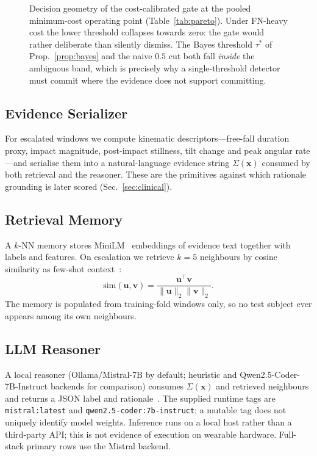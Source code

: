 \documentclass[journal]{IEEEtran}
\begin{document}
\begin{figure}[!t]
\centering
\resizebox{\linewidth}{!}{}
\caption{Decision geometry of the cost-calibrated gate at the pooled minimum-cost operating point (Table~\ref{tab:pareto}). Under FN-heavy cost the lower threshold collapses towards zero: the gate would rather deliberate than silently dismiss. The Bayes threshold $\tau^\ast$ of Prop.~\ref{prop:bayes} and the naive $0.5$ cut both fall \emph{inside} the ambiguous band, which is precisely why a single-threshold detector must commit where the evidence does not support committing.}
\label{fig:gateband}
\end{figure}



\subsection{Evidence Serializer}
For escalated windows we compute kinematic descriptors---free-fall duration proxy, impact magnitude, post-impact stillness, tilt change and peak angular rate---and serialise them into a natural-language evidence string $\Sigma(\mathbf{x})$ consumed by both retrieval and the reasoner. These are the primitives against which rationale grounding is later scored (Sec.~\ref{sec:clinical}).

\subsection{Retrieval Memory}
A $k$-NN memory stores MiniLM~\cite{minilm2020} embeddings of evidence text together with labels and features. On escalation we retrieve $k{=}5$ neighbours by cosine similarity as few-shot context~\cite{lewis2020rag}:
\begin{equation}
\mathrm{sim}(\mathbf{u},\mathbf{v})=\frac{\mathbf{u}^\top\mathbf{v}}{\|\mathbf{u}\|_2\|\mathbf{v}\|_2}.
\label{eq:cosine}
\end{equation}
The memory is populated from training-fold windows only, so no test subject ever appears among its own neighbours.

\subsection{LLM Reasoner}
A local reasoner (Ollama/Mistral-7B by default; heuristic and Qwen2.5-Coder-7B-Instruct backends for comparison) consumes $\Sigma(\mathbf{x})$ and retrieved neighbours and returns a JSON label and rationale~\cite{wei2022cot,mistral2023,qwen2024,ollama}. The supplied runtime tags are \texttt{mistral:latest} and \texttt{qwen2.5-coder:7b-instruct}; a mutable tag does not uniquely identify model weights. Inference runs on a local host rather than a third-party API; this is not evidence of execution on wearable hardware. Full-stack primary rows use the Mistral backend.
\end{document}
